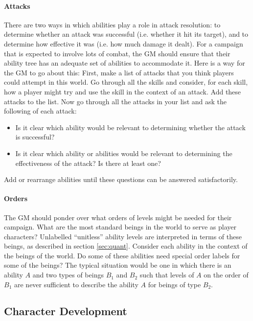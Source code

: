 \documentclass[12pt]{article}
\begin{document}
\paragraph{Attacks}
There are two ways in which abilities play a role in attack resolution:
to determine whether an attack was successful (i.e. whether it hit its target),
and to determine how effective it was (i.e. how much damage it dealt).
For a campaign that is expected to involve lots of combat, the GM
should ensure that their ability tree has an adequate set of abilities
to accommodate it.
Here is a way for the GM to go about this:
First, make a list of attacks that you think players could attempt in this world.
Go through all the skills and consider, for each skill, how a player might try and use the skill
in the context of an attack. Add these attacks to the list.
Now go through all the attacks in your list and ask the following of each attack:
\vspace{-1em}\begin{itemize}
\item Is it clear which ability would be relevant to determining whether the attack is successful?
\item Is it clear which ability or abilities would be relevant to determining the effectiveness of the attack?
Is there at least one?
\end{itemize}
Add or rearrange abilities until these questions can be answered satisfactorily.


\paragraph{Orders}
The GM should ponder over what orders of levels might be needed for their campaign.
What are the most standard beings in the world to serve as player characters?
Unlabelled ``unitless'' ability levels are interpreted in terms of these beings,
as described in section \ref{sec:quant}.
Consider each ability in the context of the beings of the world.
Do some of these abilities need special order labels for some of the beings?
The typical situation would be one in which there is an ability $A$ and
two types of beings $B_1$ and $B_2$ such that
levels of $A$ on the order of $B_1$ are never sufficient
to describe the ability $A$ for beings of type $B_2$.


\subsection{Character Development}\label{sec:dev}
\end{document}
